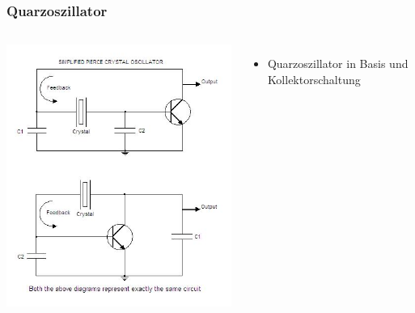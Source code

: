 \begin{frame}
    \frametitle{Quarzoszillator}
    \begin{columns}
        \includegraphics[width=\textwidth,height=.85\textheight,keepaspectratio]{a07/PIERCE_CRYSTAL_OSCILLATOR.jpg}
     	\begin{itemize}
			\item Quarzoszillator in Basis und Kollektorschaltung
    	\end{itemize}
      \end{columns}
\end{frame}

